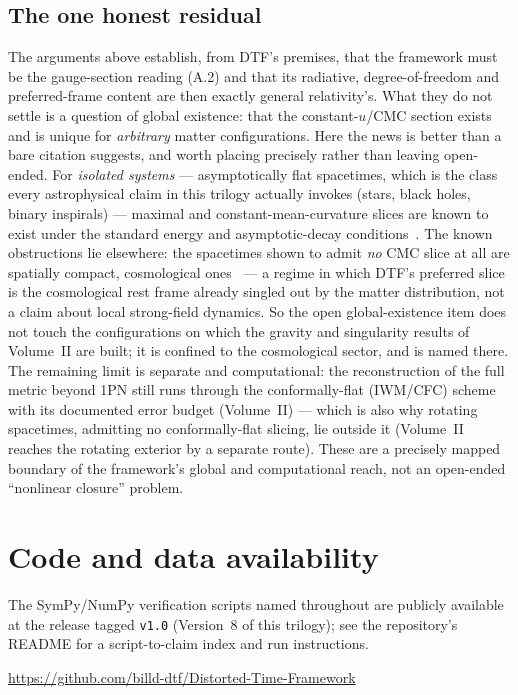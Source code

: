 \documentclass[11pt]{article}
\begin{document}
\subsection*{The one honest residual}
The arguments above establish, from DTF's premises, that the framework must be the gauge-section reading
(A.2) and that its radiative, degree-of-freedom and preferred-frame content are then exactly general
relativity's. What they do not settle is a question of global existence: that the constant-$u$/CMC section
exists and is unique for \emph{arbitrary} matter configurations. Here the news is better than a bare
citation suggests, and worth placing precisely rather than leaving open-ended. For \emph{isolated systems}
--- asymptotically flat spacetimes, which is the class every astrophysical claim in this trilogy actually
invokes (stars, black holes, binary inspirals) --- maximal and constant-mean-curvature slices are known to
exist under the standard energy and asymptotic-decay conditions~\cite{Bartnik1984,MarsdenTipler1980,Gerhardt1983}.
The known obstructions lie elsewhere: the spacetimes shown to admit \emph{no} CMC slice at all are
spatially compact, cosmological ones~\cite{Bartnik1988} --- a regime in which DTF's preferred slice is the
cosmological rest frame already singled out by the matter distribution, not a claim about local strong-field
dynamics. So the open global-existence item does not touch the configurations on which the gravity and
singularity results of Volume~II are built; it is confined to the cosmological sector, and is named there.
The remaining limit is separate and computational: the reconstruction of the full metric beyond 1PN still
runs through the conformally-flat (IWM/CFC) scheme with its documented error budget (Volume~II) --- which is
also why rotating spacetimes, admitting no conformally-flat slicing, lie outside it (Volume~II reaches the
rotating exterior by a separate route). These are a precisely mapped boundary of the framework's global and
computational reach, not an open-ended ``nonlinear closure'' problem.

\section*{Code and data availability}
{\small The SymPy/NumPy verification scripts named throughout are publicly available at the release tagged
\texttt{v1.0} (Version~8 of this trilogy); see the repository's README for a script-to-claim index and run
instructions.\par
\smallskip
\url{https://github.com/billd-dtf/Distorted-Time-Framework}\par}
\end{document}
